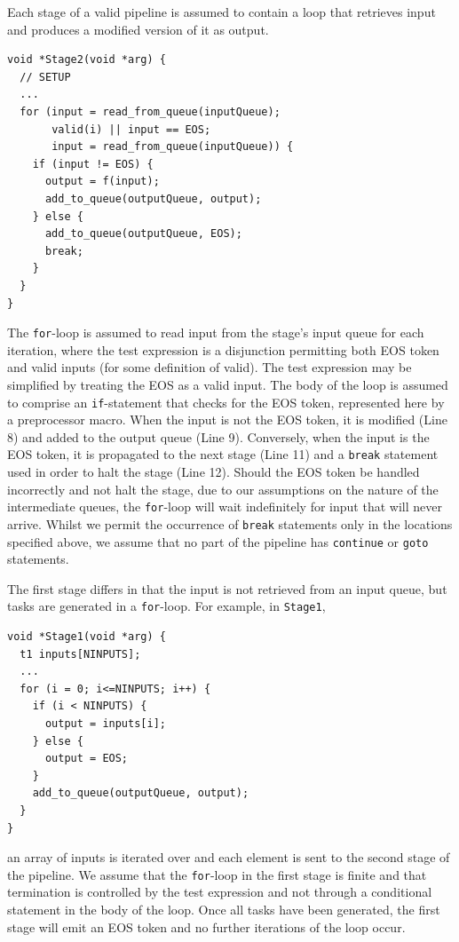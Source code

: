 Each stage of a valid pipeline is assumed to contain a loop that retrieves input and produces a modified version of it as output.
%
\begin{lstlisting}
void *Stage2(void *arg) {
  // SETUP
  ...
  for (input = read_from_queue(inputQueue);
       valid(i) || input == EOS;
       input = read_from_queue(inputQueue)) {
    if (input != EOS) {
      output = f(input);
      add_to_queue(outputQueue, output);
    } else {
      add_to_queue(outputQueue, EOS);
      break;
    }
  }
}
\end{lstlisting}
%
\noindent
The \lstinline|for|-loop is assumed to read input from the stage's input queue for each iteration, where the test expression is a disjunction permitting both EOS token and valid inputs (for some definition of valid). The test expression may be simplified by treating the EOS as a valid input.
%
The body of the loop is assumed to comprise an \lstinline|if|-statement that checks for the EOS token, represented here by a preprocessor macro. When the input is not the EOS token, it is modified (Line 8) and added to the output queue (Line 9).
%
Conversely, when the input is the EOS token, it is propagated to the next stage (Line 11) and a \lstinline|break| statement used in order to halt the stage (Line 12). Should the EOS token be handled incorrectly and not halt the stage, due to our assumptions on the nature of the intermediate queues, the \lstinline|for|-loop will wait indefinitely for input that will never arrive. Whilst we permit the occurrence of \lstinline|break| statements only in the locations specified above, we assume that no part of the pipeline has \lstinline|continue| or \lstinline|goto| statements.

The first stage differs in that the input is not retrieved from an input queue, but tasks are generated in a \lstinline|for|-loop. For example, in \lstinline|Stage1|,
%
\begin{lstlisting}
void *Stage1(void *arg) {
  t1 inputs[NINPUTS];
  ...
  for (i = 0; i<=NINPUTS; i++) {
    if (i < NINPUTS) {
      output = inputs[i];
    } else {
      output = EOS;
    }
    add_to_queue(outputQueue, output);
  }
}
\end{lstlisting}
%
an array of inputs is iterated over and each element is sent to the second stage of the pipeline.
%
We assume that the \lstinline|for|-loop in the first stage is finite and that termination is controlled by the test expression and not through a conditional statement in the body of the loop.
%
Once all tasks have been generated, the first stage will emit an EOS token and no further iterations of the loop occur.


